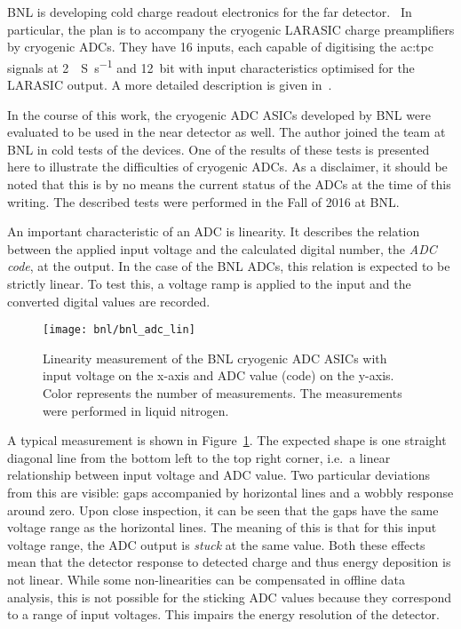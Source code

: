 BNL is developing cold charge readout electronics for the \dune{} far detector.~\cite{protodune-sp}
In particular, the plan is to accompany the cryogenic LARASIC charge preamplifiers by cryogenic ADCs.
They have \num{16} inputs, each capable of digitising the \gls{ac:tpc} signals at \SI{2}{\mega{}S\per\second} and \SI{12}{bit} with input characteristics optimised for the LARASIC output.
A more detailed description is given in~\cite{bnl_adc}.

In the course of this work, the cryogenic ADC ASICs developed by BNL were evaluated to be used in the near detector as well.
The author joined the team at BNL in cold tests of the devices.
One of the results of these tests is presented here to illustrate the difficulties of cryogenic ADCs.
As a disclaimer, it should be noted that this is by no means the current status of the ADCs at the time of this writing.
The described tests were performed in the Fall of 2016 at BNL.

An important characteristic of an ADC is linearity.
It describes the relation between the applied input voltage and the calculated digital number, the \emph{ADC code}, at the output.
In the case of the BNL ADCs, this relation is expected to be strictly linear.
To test this, a voltage ramp is applied to the input and the converted digital values are recorded.

\begin{figure}[htb]
	\centering
	\texttt{[image: bnl/bnl\_adc\_lin]}
	\caption{Linearity measurement of the BNL cryogenic ADC ASICs with input voltage on the x-axis and ADC value (code) on the y-axis.
	Color represents the number of measurements.
	The measurements were performed in liquid nitrogen.}
	\label{fig:bnl_adc_lin}
\end{figure}

A typical measurement is shown in Figure~\ref{fig:bnl_adc_lin}.
The expected shape is one straight diagonal line from the bottom left to the top right corner, i.e.\ a linear relationship between input voltage and ADC value.
Two particular deviations from this are visible: gaps accompanied by horizontal lines and a wobbly response around zero.
Upon close inspection, it can be seen that the gaps have the same voltage range as the horizontal lines.
The meaning of this is that for this input voltage range, the ADC output is \emph{stuck} at the same value.
Both these effects mean that the detector response to detected charge and thus energy deposition is not linear.
While some non-linearities can be compensated in offline data analysis, this is not possible for the sticking ADC values because they correspond to a range of input voltages.
This impairs the energy resolution of the detector.

